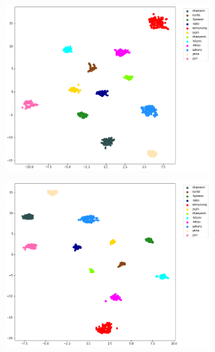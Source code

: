 \begin{enumerate}[left=0pt]
\begin{figure}[htbp]
    \centering
    \begin{subfigure}{0.24\textwidth}
        \centering
        \includegraphics[trim=31 20 100 0, clip, width=\textwidth]{images/faceReco/inceptionv3-and-binary/tsne-1.png}     
    \end{subfigure}
    \hfill
    \begin{subfigure}{0.24\textwidth}
        \centering
        \includegraphics[trim=35 20 100 0, clip, width=\textwidth]{images/faceReco/inceptionv3-and-binary/tsne-2.png}     
    \end{subfigure}

\end{figure}
\end{enumerate}
